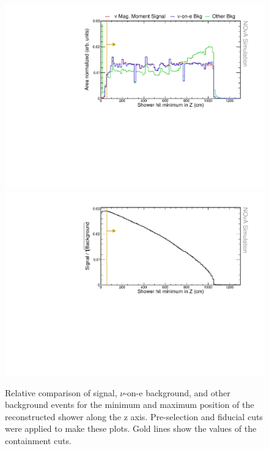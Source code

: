 \begin{figure}[hbtp]
\centering
\includegraphics[width=.9\textwidth]{Plots/NuMMEventSelection/N1Cut_minZ.pdf}
\includegraphics[width=.9\textwidth]{Plots/NuMMEventSelection/NuMM_N1Cut_minZright_FOMStats.pdf}
\caption{Relative comparison of signal, $\nu$-on-e background, and other background events for the minimum and maximum position of the reconstructed shower along the z axis. Pre-selection and fiducial cuts were applied to make these plots. Gold lines show the values of the containment cuts.}
\label{fig:NuMMContainmentCutMinZ}
\end{figure}

